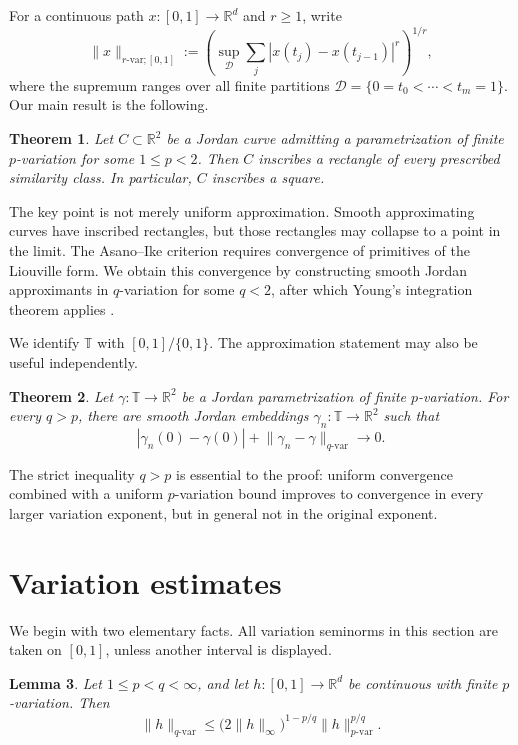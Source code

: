 \documentclass[11pt,reqno]{amsart}
\newtheorem{theorem}{Theorem}[section]
\newtheorem{lemma}[theorem]{Lemma}
\theoremstyle{definition}
\theoremstyle{remark}
\newcommand{\R}{\mathbb{R}}
\newcommand{\T}{\mathbb{T}}
\begin{document}
For a continuous path \(x\colon[0,1]\to\R^d\) and \(r\geq1\), write
\[
 \lVert x\rVert_{r\text{-var};[0,1]}
 :=\left(
 \sup_{\mathcal D}\sum_{j}|x(t_j)-x(t_{j-1})|^r
 \right)^{1/r},
\]
where the supremum ranges over all finite partitions
\(\mathcal D=\{0=t_0<\cdots<t_m=1\}\).  Our main result is the following.

\begin{theorem}\label{thm:main}
Let \(C\subset\R^2\) be a Jordan curve admitting a parametrization of finite
\(p\)-variation for some \(1\leq p<2\).  Then \(C\) inscribes a rectangle of
every prescribed similarity class.  In particular, \(C\) inscribes a square.
\end{theorem}

The key point is not merely uniform approximation.  Smooth approximating
curves have inscribed rectangles, but those rectangles may collapse to a
point in the limit.  The Asano--Ike criterion requires convergence of
primitives of the Liouville form.  We obtain this convergence by constructing
smooth Jordan approximants in \(q\)-variation for some \(q<2\), after which
Young's integration theorem applies \cite{Young1936}.

We identify \(\T\) with \([0,1]/\{0,1\}\). The approximation statement may also be useful independently.

\begin{theorem}\label{thm:approx-intro}
Let \(\gamma\colon\T\to\R^2\) be a Jordan parametrization of finite
\(p\)-variation.  For every \(q>p\), there are smooth Jordan embeddings
\(\gamma_n\colon\T\to\R^2\) such that
\[
 |\gamma_n(0)-\gamma(0)|
 +\lVert\gamma_n-\gamma\rVert_{q\text{-var}}
 \longrightarrow0.
\]
\end{theorem}

The strict inequality \(q>p\) is essential to the proof: uniform convergence
combined with a uniform \(p\)-variation bound improves to convergence in every
larger variation exponent, but in general not in the original exponent.

\section{Variation estimates}

We begin with two elementary facts.  All variation seminorms in this section
are taken on \([0,1]\), unless another interval is displayed.

\begin{lemma}\label{lem:interpolation}
Let \(1\leq p<q<\infty\), and let \(h\colon[0,1]\to\R^d\) be continuous with
finite \(p\)-variation.  Then
\begin{equation}\label{eq:variation-interpolation}
 \lVert h\rVert_{q\text{-var}}
 \leq
 \bigl(2\lVert h\rVert_\infty\bigr)^{1-p/q}
 \lVert h\rVert_{p\text{-var}}^{p/q}.
\end{equation}
\end{lemma}
\end{document}
